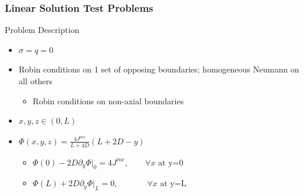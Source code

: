 \documentclass[]{beamer}
\begin{document}
\begin{frame}[t]\frametitle{Linear Solution Test Problems}
    	\begin{block}{Problem Description}
		\begin{itemize}
			\item $\sigma = q = 0$
			\item Robin conditions on 1 set of opposing boundaries; homogeneous Neumann on all others
			\begin{itemize}
				\item Robin conditions on non-axial boundaries
			\end{itemize}
			\item $x,y,z \in (0,L)$
			\item $\Phi (x,y,z) =\frac{4 J^{inc}}{L+4D} \left(  L + 2D - y  \right)$
			\begin{itemize}
				\item $\Phi(0) - 2D \partial_y \Phi|_0 = 4 J^{inc}, \qquad \forall x\text{ at y=0}$
				\item $\Phi(L) + 2D \partial_y \Phi |_L = 0, \qquad \,\,\,\,\,\,\,\,\, \forall x\text{ at y=L} $
			\end{itemize}
		\end{itemize}
	\end{block}
\end{frame}
\end{document}
